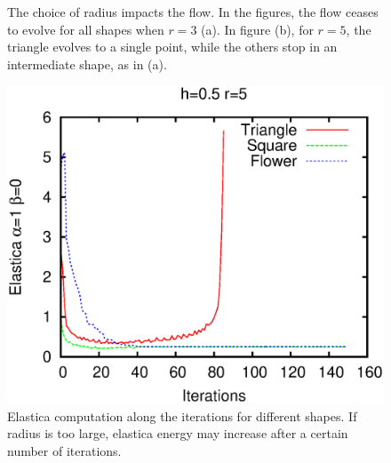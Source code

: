 \documentclass[runningheads]{llncs}
\begin{document}
\begin{figure}[!ht]
{		\hspace{15pt}
		}				
\caption{The choice of radius impacts the flow. In the figures, the flow ceases to evolve for all shapes  when $r=3$ (a). In figure (b), for $r=5$, the triangle evolves to a single point, while the others stop  in an intermediate shape, as in (a). }
\label{fig:mx-flow-gs-radius-effect}
\end{figure}

\begin{figure}[!ht]
\center
\includegraphics[scale=0.5]{images/flow/elastica-energy-plot/r5h05.eps}
\caption{Elastica computation along the iterations for different shapes. If radius is too large, elastica energy may increase after a certain number of iterations. }
\label{fig:mx-elastica-plots}
\end{figure}
\end{document}

